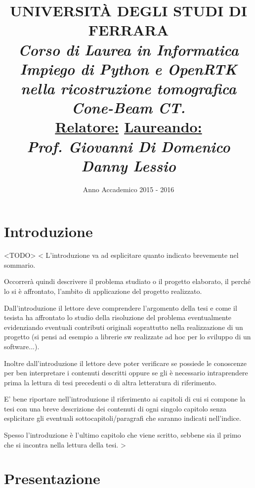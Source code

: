 \documentclass[a4paper,12pt, doubleside]{report}
\title{\textbf{UNIVERSITÀ DEGLI STUDI DI FERRARA\\}
\bigskip
\textit{Corso di Laurea in Informatica}\\
\bigskip
\bigskip
\bigskip
\bigskip
\bigskip
\bigskip
\bigskip
\bigskip
\bigskip
\bigskip
\bigskip
\bigskip
\bigskip
\bigskip
\bigskip
\bigskip
\textit{\textbf{Impiego di Python e OpenRTK nella ricostruzione tomografica Cone-Beam CT.\\}}
\bigskip
\bigskip
\bigskip
\bigskip
\bigskip
\bigskip
\bigskip
\bigskip
\bigskip
\bigskip
\bigskip
\bigskip
\bigskip
\bigskip
\bigskip
\bigskip
\bigskip
\bigskip
\bigskip
\bigskip
\bigskip
\textbf{\underline{Relatore:}}
\hfill
\textbf{\underline{Laureando:}\thinspace\thinspace\thinspace} \\
\textit{Prof. Giovanni Di Domenico}
\hfill
\textit{Danny Lessio}
\bigskip
\bigskip
\bigskip
\bigskip
\bigskip
\bigskip
\bigskip
\bigskip
\bigskip
}
\date{Anno Accademico 2015 - 2016}
\begin{document}
    \maketitle
    \newpage

    \chapter*{Introduzione}
        \par
            <TODO>
            <
        		L'introduzione va ad esplicitare quanto indicato brevemente nel sommario.
        
        		Occorrerà quindi descrivere il problema studiato o il progetto elaborato, il perché lo si è affrontato, l'ambito di applicazione del progetto realizzato.
        
        		Dall'introduzione il lettore deve comprendere l'argomento della tesi e come il tesista ha affrontato lo studio della risoluzione del problema eventualmente evidenziando eventuali contributi originali soprattutto nella realizzazione di un progetto (si pensi ad esempio a librerie sw realizzate ad hoc per lo sviluppo di un software...).
        
        		Inoltre dall'introduzione il lettore deve poter verificare se possiede le conoscenze per ben interpretare i contenuti descritti oppure se gli è necessario intraprendere prima la lettura di tesi precedenti o di altra letteratura di riferimento.
        
        		E' bene riportare nell'introduzione il riferimento ai capitoli di cui si compone la tesi con una breve descrizione dei contenuti di ogni singolo capitolo senza esplicitare gli eventuali sottocapitoli/paragrafi che saranno indicati nell'indice.
        
        		Spesso l'introduzione è l'ultimo capitolo che viene scritto, sebbene sia il primo che si incontra nella lettura della tesi.
        	>
    
    \newpage
    \tableofcontents
    \newpage
    \chapter{Presentazione}
\end{document}

